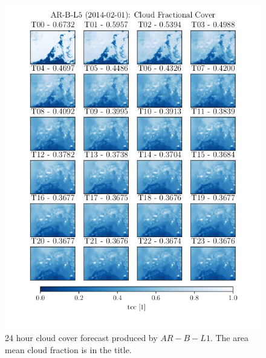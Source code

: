 \begin{figure}[ht]
    \centering
    \includegraphics{python_figs/AR-B-L5_timelapse_cloud_cover_24hrs_from_2014_02_01.png}
    \caption{24 hour cloud cover forecast produced by $AR-B-L1$. The area mean  cloud fraction is in the title.}
    \label{fig:timelapse_ar}
\end{figure}
